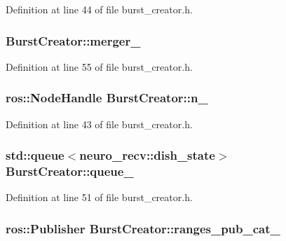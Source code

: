 \-Definition at line 44 of file burst\-\_\-creator.\-h.

\subsubsection[{merger\-\_\-}]{ {\bf \-Burst\-Creator\-::merger\-\_\-}\hspace{0.3cm}{\ttfamily  [private]}}\label{classBurstCreator_affd99155a0768c4f31ab31cc4852bdb6}


\-Definition at line 55 of file burst\-\_\-creator.\-h.

\subsubsection[{n\-\_\-}]{\setlength{\rightskip}{0pt plus 5cm}ros\-::\-Node\-Handle {\bf \-Burst\-Creator\-::n\-\_\-}\hspace{0.3cm}{\ttfamily  [private]}}\label{classBurstCreator_adb68a95ef58aaffe8809ae2ba8f3842c}


\-Definition at line 43 of file burst\-\_\-creator.\-h.

\subsubsection[{queue\-\_\-}]{\setlength{\rightskip}{0pt plus 5cm}std\-::queue$<$neuro\-\_\-recv\-::dish\-\_\-state$>$ {\bf \-Burst\-Creator\-::queue\-\_\-}\hspace{0.3cm}{\ttfamily  [private]}}\label{classBurstCreator_afc7c28789c569b386d1edc732d29ce27}


\-Definition at line 51 of file burst\-\_\-creator.\-h.

\subsubsection[{ranges\-\_\-pub\-\_\-cat\-\_\-}]{\setlength{\rightskip}{0pt plus 5cm}ros\-::\-Publisher {\bf \-Burst\-Creator\-::ranges\-\_\-pub\-\_\-cat\-\_\-}\hspace{0.3cm}{\ttfamily  [private]}}\label{classBurstCreator_ab86be8c5b297e82bf23e4aa9a254c823}


